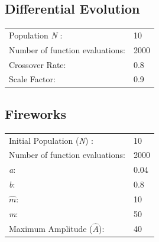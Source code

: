 \documentclass[11pt, a4paper]{report}
\begin{document}
\subsection{Differential Evolution}
\begin{tabular}{l l}
	Population \textit{N} : & 10\\
	Number of function evaluations: & 2000 \\ 
	Crossover Rate: & 0.8 \\
	Scale Factor: & 0.9 \\
\end{tabular}

\subsection{Fireworks}
\begin{tabular}{l l}
	Initial Population (\textit{N}) : & 10\\
	Number of function evaluations: & 2000 \\ 
	\textit{a}: & 0.04 \\
	\textit{b}: & 0.8 \\
	$ \hat{m} $: & 10 \\
	\textit{m}: & 50 \\
	Maximum Amplitude ($ \hat{A} $): & 40 \\
\end{tabular}
\end{document}
